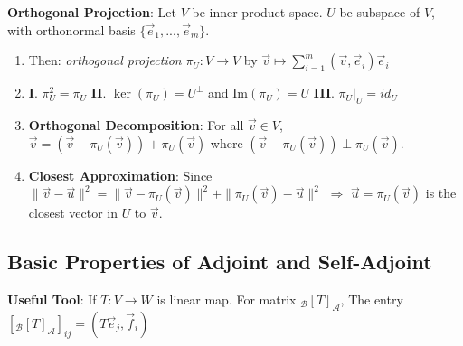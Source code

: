 \documentclass[9pt]{article}
\begin{document}
\textbf{Orthogonal Projection}: Let $V$ be inner product space. \quad $U$ be subspace of $V$, with orthonormal basis $\{\vec{e}_1,...,\vec{e}_m\}$. 

\begin{enumerate}[itemsep=-2pt, topsep=-2pt]
    \item Then: \textit{orthogonal projection} $\pi_U:V\to V$ by $\vec{v}\mapsto\sum_{i=1}^m(\vec{v},\vec{e}_i)\vec{e}_i$
    \item \textbf{I}. $\pi^2_U=\pi_U$ \qquad \textbf{II}. $\ker(\pi_U)=U^\perp$ \quad and \quad $\text{Im}(\pi_U)=U$ \qquad \textbf{III}. $\pi_U|_U=id_U$
    \item \textbf{Orthogonal Decomposition}: For all $\vec{v}\in V$, $\vec{v}=(\vec{v}-\pi_U(\vec{v}))+\pi_U(\vec{v})$ where $(\vec{v}-\pi_U(\vec{v}))\perp \pi_U(\vec{v})$.
    \item \textbf{Closest Approximation}: Since $\|\vec{v}-\vec{u}\|^2=\|\vec{v}-\pi_U(\vec{v})\|^2+\|\pi_U(\vec{v})-\vec{u}\|^2$ \quad $\Rightarrow$ \quad $\vec{u}=\pi_U(\vec{v})$ is the closest vector in $U$ to $\vec{v}$.
\end{enumerate}


\subsection{Basic Properties of Adjoint and Self-Adjoint} %


\textbf{Useful Tool}: If $T:V\to W$ is linear map. \quad For matrix $_{\mathcal{B}}[T]_{\mathcal{A}}$, The entry $[_{\mathcal{B}}[T]_{\mathcal{A}}]_{ij}=(T\vec{e}_j,\vec{f}_i)$
\end{document}
